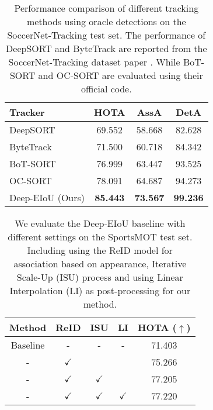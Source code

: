 \documentclass[10pt,twocolumn,letterpaper]{article}
\begin{document}
\begin{table}[h]
\centering
\begin{tabular}{lccc}
\hline
Tracker & HOTA & AssA & DetA \\ \hline
DeepSORT \cite{DeepSORT}          & 69.552 & 58.668 & 82.628  \\
ByteTrack \cite{ByteTrack}        & 71.500 & 60.718 & 84.342  \\
BoT-SORT \cite{aharon2022bot}     & 76.999 & 63.447 & 93.525  \\
OC-SORT  \cite{OCSORT}             & 78.091 & 64.687 & 94.273  \\
\rowcolor{aliceblue}
Deep-EIoU (Ours)  & \textbf{85.443} & \textbf{73.567} & \textbf{99.236} \\
\hline
\end{tabular}
\caption{Performance comparison of different tracking methods using oracle detections on the SoccerNet-Tracking \cite{cioppa2022soccernet} test set. The performance of DeepSORT and ByteTrack are reported from the SoccerNet-Tracking dataset paper \cite{cioppa2022soccernet}. While BoT-SORT and OC-SORT are evaluated using their official code.}
\label{table:soccernet}
\end{table}

\begin{table}[h]
\centering
\begin{tabular}{ccccc}
\hline
Method   & ReID         & ISU          & LI           & HOTA ($\uparrow$) \\ \hline
Baseline & -            & -            & -            & 71.403\\
-        & $\checkmark$ &              &              & 75.266\\
-        & $\checkmark$ & $\checkmark$ &              & 77.205\\
-        & $\checkmark$ & $\checkmark$ & $\checkmark$ & 77.220\\
\hline
\end{tabular}
\caption{We evaluate the Deep-EIoU baseline with different settings on the SportsMOT test set. Including using the ReID model for association based on appearance, Iterative Scale-Up (ISU) process and using Linear Interpolation (LI) as post-processing for our method.}
\label{table:add}
\end{table}
\end{document}
